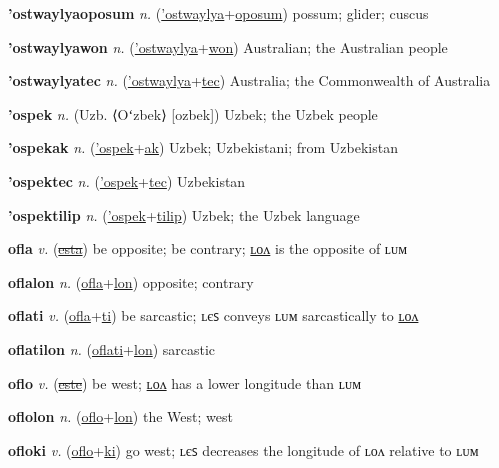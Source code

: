 \textbf{\hypertarget{'ostwaylyaoposum}{'ostwaylyaoposum}} \textit{n.} (\hyperlink{'ostwaylya}{'ostwaylya}+\allowbreak \hyperlink{oposum}{oposum})
possum; glider; cuscus

\textbf{\hypertarget{'ostwaylyawon}{'ostwaylyawon}} \textit{n.} (\hyperlink{'ostwaylya}{'ostwaylya}+\allowbreak \hyperlink{won}{won})
Australian; the Australian people

\textbf{\hypertarget{'ostwaylyatec}{'ostwaylyatec}} \textit{n.} (\hyperlink{'ostwaylya}{'ostwaylya}+\allowbreak \hyperlink{tec}{tec})
Australia; the Commonwealth of Australia

\textbf{\hypertarget{'ospek}{'ospek}} \textit{n.} (Uzb. ⟨Oʻzbek⟩ [ozbek])
Uzbek; the Uzbek people

\textbf{\hypertarget{'ospekak}{'ospekak}} \textit{n.} (\hyperlink{'ospek}{'ospek}+\allowbreak \hyperlink{ak}{ak})
Uzbek; Uzbekistani; from Uzbekistan

\textbf{\hypertarget{'ospektec}{'ospektec}} \textit{n.} (\hyperlink{'ospek}{'ospek}+\allowbreak \hyperlink{tec}{tec})
Uzbekistan

\textbf{\hypertarget{'ospektilip}{'ospektilip}} \textit{n.} (\hyperlink{'ospek}{'ospek}+\allowbreak \hyperlink{tilip}{tilip})
Uzbek; the Uzbek language

\textbf{\hypertarget{ofla}{ofla}} \textit{v.} (\hyperlink{esta}{\sout{esta}})
be opposite; be contrary; \hyperlink{oflalon}{ʟᴏᴧ} is the opposite of ʟᴜᴍ

\textbf{\hypertarget{oflalon}{oflalon}} \textit{n.} (\hyperlink{ofla}{ofla}+\allowbreak \hyperlink{lon}{lon})
opposite; contrary

\textbf{\hypertarget{oflati}{oflati}} \textit{v.} (\hyperlink{ofla}{ofla}+\allowbreak \hyperlink{ti}{ti})
be sarcastic; ʟєꜱ conveys ʟᴜᴍ sarcastically to \hyperlink{oflatilon}{ʟᴏᴧ}

\textbf{\hypertarget{oflatilon}{oflatilon}} \textit{n.} (\hyperlink{oflati}{oflati}+\allowbreak \hyperlink{lon}{lon})
sarcastic

\textbf{\hypertarget{oflo}{oflo}} \textit{v.} (\hyperlink{este}{\sout{este}})
be west; \hyperlink{oflolon}{ʟᴏᴧ} has a lower longitude than ʟᴜᴍ

\textbf{\hypertarget{oflolon}{oflolon}} \textit{n.} (\hyperlink{oflo}{oflo}+\allowbreak \hyperlink{lon}{lon})
the West; west

\textbf{\hypertarget{ofloki}{ofloki}} \textit{v.} (\hyperlink{oflo}{oflo}+\allowbreak \hyperlink{ki}{ki})
go west; ʟєꜱ decreases the longitude of ʟᴏᴧ relative to ʟᴜᴍ

